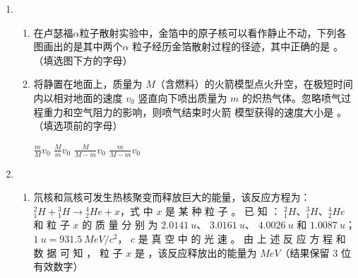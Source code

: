 \begin{enumerate}
\item 
{}
\begin{enumerate}
	\item
在卢瑟福$ \alpha $粒子散射实验中，金箔中的原子核可以看作静止不动，下列各图画出的是其中两个$ \alpha $
粒子经历金箔散射过程的径迹，其中正确的是 \underlinegap 。（填选图下方的字母）


\pfourchoices
{}
{}
{}
{}


\item 
将静置在地面上，质量为 $ M $（含燃料）的火箭模型点火升空，在极短时间内以相对地面的速度
$ v_{0} $ 竖直向下喷出质量为 $ m $ 的炽热气体。忽略喷气过程重力和空气阻力的影响，则喷气结束时火箭
模型获得的速度大小是
 \underlinegap 
。（填选项前的字母）

\fourchoices
{$\frac{m}{M} v_{0}$}
{$\frac{M}{m} v_{0}$}
{$\frac{M}{M-m} v_{0}$}
{$\frac{m}{M-m} v_{0}$}

	
\end{enumerate}


\item 
{}
\begin{enumerate}
	\item
氘核和氚核可发生热核聚变而释放巨大的能量，该反应方程为：${ }_{1}^{2} H+{ }_{1}^{3} H \rightarrow{ }_{2}^{4} He+x$，式
中 $ x $ 是 某 种 粒 子 。 已 知 ： ${ }_{1}^{2} H $、$ { }_{1}^{3} H $、$ { }_{2}^{4} He$ 和 粒 子 $ x $ 的 质 量 分 别 为 $ 2.0141 \ u $、 $ 3.0161 \ u $、 $ 4.0026 \ u $ 和
$ 1. 0087 \ u $； $ 1 \ u=931.5 \ MeV/c^{2} $， $ c $ 是 真 空 中 的 光 速 。 由 上 述 反 应 方 程 和 数 据 可 知 ， 粒 子 $ x $ 是 \underlinegap 
，该反应释放出的能量为  \underlinegap  $ MeV $（结果保留 $ 3 $ 位有效数字）



\end{enumerate}
\end{enumerate}
